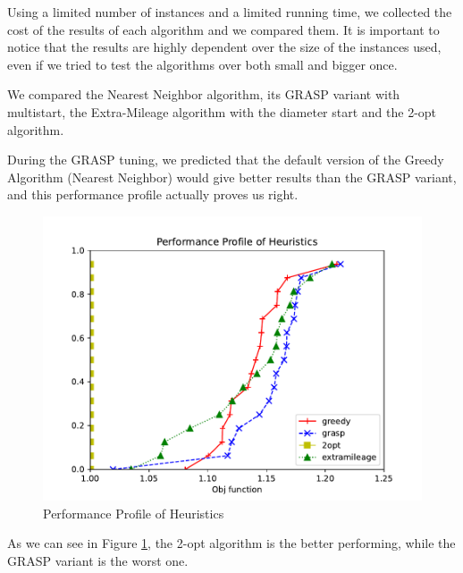Using a limited number of instances and a limited running time, we collected the cost of the results of each algorithm and we compared them. It is important to notice that the results are highly dependent over the size of the instances used, even if we tried to test the algorithms over both small and bigger once.

We compared the Nearest Neighbor algorithm, its GRASP variant with multistart, the Extra-Mileage algorithm with the diameter start and the 2-opt algorithm.

During the GRASP tuning, we predicted that the default version of the Greedy Algorithm (Nearest Neighbor) would give better results than the GRASP variant, and this performance profile actually proves us right.

\begin{figure}[!h]
    \centering
    \includegraphics[width=\textwidth]{images/gge2.pdf}
    \caption{Performance Profile of Heuristics}
    \label{fig:gge2}
\end{figure}

As we can see in Figure \ref{fig:gge2}, the 2-opt algorithm is the better performing, while the GRASP variant is the worst one. 



